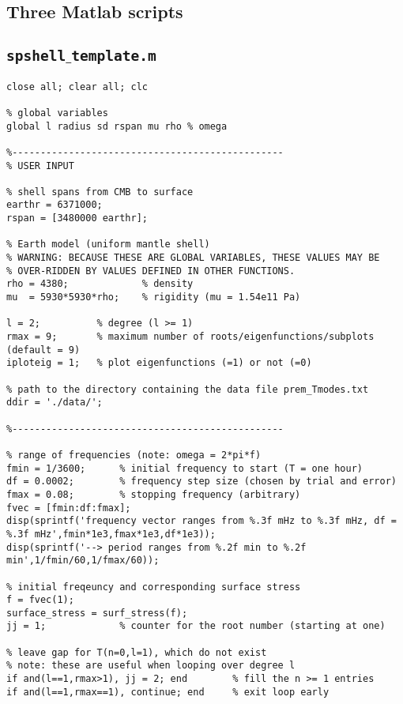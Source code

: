 \documentclass[11pt,titlepage,fleqn]{article}
\begin{document}
\begin{spacing}{1.0}

\section{Three Matlab scripts}

\subsection{\tt spshell$\_$template.m}
\label{sec:shell}

\small
\begin{verbatim}
close all; clear all; clc

% global variables
global l radius sd rspan mu rho % omega

%------------------------------------------------
% USER INPUT

% shell spans from CMB to surface
earthr = 6371000;
rspan = [3480000 earthr];

% Earth model (uniform mantle shell)
% WARNING: BECAUSE THESE ARE GLOBAL VARIABLES, THESE VALUES MAY BE
% OVER-RIDDEN BY VALUES DEFINED IN OTHER FUNCTIONS.
rho = 4380;             % density
mu  = 5930*5930*rho;    % rigidity (mu = 1.54e11 Pa)

l = 2;          % degree (l >= 1)
rmax = 9;       % maximum number of roots/eigenfunctions/subplots (default = 9)
iploteig = 1;   % plot eigenfunctions (=1) or not (=0)

% path to the directory containing the data file prem_Tmodes.txt
ddir = './data/';

%------------------------------------------------

% range of frequencies (note: omega = 2*pi*f)
fmin = 1/3600;      % initial frequency to start (T = one hour)
df = 0.0002;        % frequency step size (chosen by trial and error)
fmax = 0.08;        % stopping frequency (arbitrary)
fvec = [fmin:df:fmax];
disp(sprintf('frequency vector ranges from %.3f mHz to %.3f mHz, df = %.3f mHz',fmin*1e3,fmax*1e3,df*1e3));
disp(sprintf('--> period ranges from %.2f min to %.2f min',1/fmin/60,1/fmax/60));

% initial freqeuncy and corresponding surface stress
f = fvec(1);
surface_stress = surf_stress(f);
jj = 1;             % counter for the root number (starting at one)

% leave gap for T(n=0,l=1), which do not exist
% note: these are useful when looping over degree l
if and(l==1,rmax>1), jj = 2; end        % fill the n >= 1 entries
if and(l==1,rmax==1), continue; end     % exit loop early


\end{verbatim}
\end{spacing}
\end{document}
